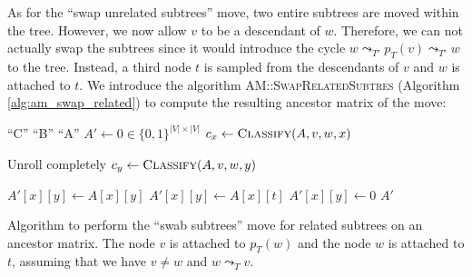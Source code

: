 As for the ``swap unrelated subtrees'' move, two entire subtrees are moved within the tree. However, we now allow $v$ to be a descendant of $w$. Therefore, we can not actually swap the subtrees since it would introduce the cycle $w \leadsto_{T'} p_T(v) \leadsto_{T'} w$ to the tree. Instead, a third node $t$ is sampled from the descendants of $v$ and $w$ is attached to $t$. We introduce the algorithm \textsc{AM::SwapRelatedSubtres} (Algorithm \ref{alg:am_swap_related}) to compute the resulting ancestor matrix of the move:

\begin{algorithm}
    \begin{algorithmic}[1]
                \State \Return ``C''
                \State \Return ``B''
            \Else
                \State \Return ``A''
            \EndIf
        \EndFunction
        \State
        \State $A' \leftarrow 0 \in \{0,1\}^{|V| \times |V|}$
            \State $c_x \leftarrow \textsc{Classify}(A, v, w, x)$

             \Comment Unroll completely
                \State $c_y \leftarrow \textsc{Classify}(A, v, w, y)$

                    \State $A'[x][y] \leftarrow A[x][y]$
                    \State $A'[x][y] \leftarrow A[x][t]$
                \Else
                    \State $A'[x][y] \leftarrow 0$
                \EndIf
            \EndFor
        \EndFor
        \State \Return $A'$
        \EndFunction
    \end{algorithmic}
    \caption{Algorithm to perform the ``swab subtrees'' move for related subtrees on an ancestor matrix. The node $v$ is attached to $p_T(w)$ and the node $w$ is attached to $t$, assuming that we have $v \neq w$ and $w \leadsto_T v$.}
    \label{alg:am_swap_related}
\end{algorithm}


